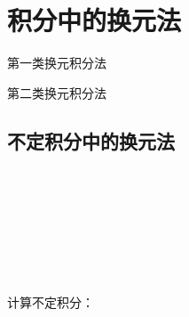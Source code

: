 \documentclass[lang=cn,newtx,10pt,scheme=chinese]{elegantbook}
\begin{document}
\chapter{积分中的换元法}

\begin{introduction}
  \item 第一类换元积分法
  \item 第二类换元积分法
  \end{introduction}
  
\section{不定积分中的换元法}
\begin{theorem}[第一类换元积分法]
  \\
  \\
\end{theorem}

\begin{note}[适用场景]
  \\
\end{note}

\begin{note}[解题步骤]
  \\
\end{note}

\begin{example}
  \\
  计算不定积分：$$
\end{example}

  
\end{document}
